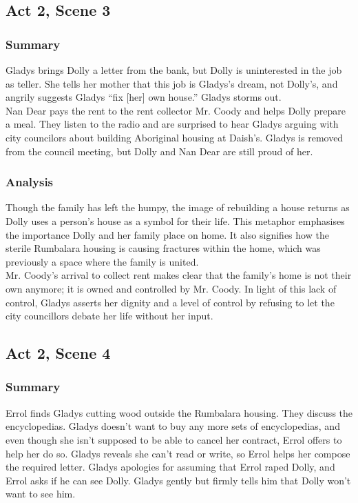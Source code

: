 \documentclass[a4paper]{article}
\begin{document}
\subsection{Act 2, Scene 3}
\subsubsection{Summary}
Gladys brings Dolly a letter from the bank, but Dolly is
uninterested in the job as teller. She tells her mother that this
job is Gladys’s dream, not Dolly’s, and angrily suggests Gladys
“fix [her] own house.” Gladys storms out.\\

Nan Dear pays the rent to the rent collector Mr. Coody and
helps Dolly prepare a meal. They listen to the radio and are
surprised to hear Gladys arguing with city councilors about
building Aboriginal housing at Daish’s. Gladys is removed from
the council meeting, but Dolly and Nan Dear are still proud of
her.\\


\subsubsection{Analysis}
Though the family has left the humpy, the image of rebuilding a
house returns as Dolly uses a person’s house as a symbol for their
life. This metaphor emphasises the importance Dolly and her family
place on home. It also signifies how the sterile Rumbalara housing is
causing fractures within the home, which was previously a space
where the family is united.\\

Mr. Coody’s arrival to collect rent makes clear that the family’s
home is not their own anymore; it is owned and controlled by Mr.
Coody. In light of this lack of control, Gladys asserts her dignity and
a level of control by refusing to let the city councillors debate her life
without her input.\\

\subsection{Act 2, Scene 4}
\subsubsection{Summary}
Errol finds Gladys cutting wood outside the Rumbalara
housing. They discuss the encyclopedias. Gladys doesn’t want
to buy any more sets of encyclopedias, and even though she
isn’t supposed to be able to cancel her contract, Errol offers to
help her do so. Gladys reveals she can’t read or write, so Errol
helps her compose the required letter. Gladys apologies for
assuming that Errol raped Dolly, and Errol asks if he can see
Dolly. Gladys gently but firmly tells him that Dolly won’t want
to see him.\\
\end{document}
